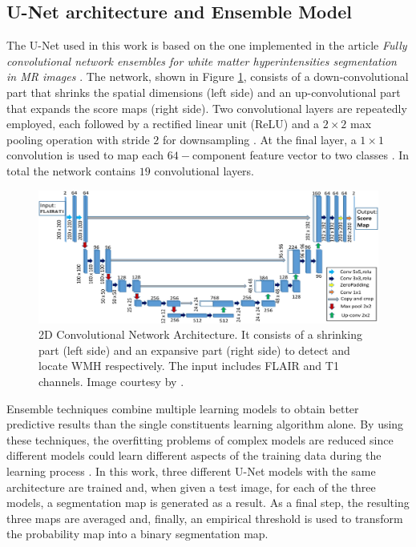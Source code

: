 \documentclass[12pt]{extarticle}
\begin{document}
\subsection{U-Net architecture and Ensemble Model}\label{sec:unet arch}
The U-Net used in this work is based on the one implemented in the article \textit{Fully convolutional network ensembles for white matter hyperintensities segmentation in MR images} \cite{fully_conv}. The network, shown in Figure \ref{fig:unet}, consists of a down-convolutional part that shrinks the spatial dimensions (left side) and an up-convolutional part that expands the score maps (right side).
Two convolutional layers are repeatedly employed, each followed by a rectified linear unit (ReLU) and a $2\times 2$ max pooling operation with stride $2$ for downsampling \cite{fully_conv}. At the final layer, a $1\times 1$ convolution is used to map each $64-$component feature vector to two classes \cite{fully_conv}. In total the network contains $19$ convolutional layers. 

\begin{figure}[h!]
    \centering
    \includegraphics[width = \textwidth]{images/U-Net.png}
    \caption{2D Convolutional Network Architecture. It consists of a shrinking part (left side) and an expansive part (right side) to detect and locate WMH respectively. The input includes FLAIR and T1 channels. Image courtesy by \cite{fully_conv}.}
    \label{fig:unet}
\end{figure}
\noindent
Ensemble techniques combine multiple learning models to obtain better predictive results than the single constituents learning algorithm alone. By using these techniques, the overfitting problems of complex models are reduced since different models could learn different aspects of the training data during the learning process \cite{fully_conv}. 
In this work, three different U-Net models with the same architecture are trained and, when given a test image, for each of the three models, a segmentation map is generated as a result. As a final step, the resulting three maps are averaged and, finally, an empirical threshold is used to transform the probability map into a binary segmentation map.
\end{document}
